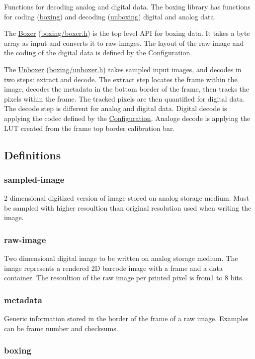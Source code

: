 Functions for decoding analog and digital data. The boxing library has functions for coding (\hyperlink{index_boxing}{boxing}) and decoding (\hyperlink{index_unboxing}{unboxing}) digital and analog data.

The \hyperlink{group__boxer}{Boxer} (\hyperlink{boxer_8h_source}{boxing/boxer.h}) is the top level API for boxing data. It takes a byte array as input and converts it to raw-\/images. The layout of the raw-\/image and the coding of the digital data is defined by the \hyperlink{group__config}{Configuration}.

The \hyperlink{group__unboxer}{Unboxer} (\hyperlink{unboxer_8h_source}{boxing/unboxer.h}) takes sampled input images, and decodes in two steps: extract and decode. The extract step locates the frame within the image, decodes the metadata in the bottom border of the frame, then tracks the pixels within the frame. The tracked pixels are then quantified for digital data. The decode step is different for analog and digital data. Digital decode is applying the codec defined by the \hyperlink{group__config}{Configuration}. Analoge decode is applying the LUT created from the frame top border calibration bar.\hypertarget{index_Definitions}{}\subsection{Definitions}\label{index_Definitions}
\hypertarget{index_sampled-image}{}\subsubsection{sampled-\/image}\label{index_sampled-image}
2 dimensional digitized version of image stored on analog storage medium. Must be sampled with higher resoultion than original resolution used when writing the image. \hypertarget{index_raw-image}{}\subsubsection{raw-\/image}\label{index_raw-image}
Two dimensional digital image to be written on analog storage medium. The image represents a rendered 2D barcode image with a frame and a data container. The resoultion of the raw image per printed pixel is from1 to 8 bits. \hypertarget{index_metadata}{}\subsubsection{metadata}\label{index_metadata}
Generic information stored in the border of the frame of a raw image. Examples can be frame number and checksums. \hypertarget{index_boxing}{}\subsubsection{boxing}\label{index_boxing}
